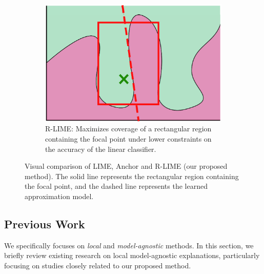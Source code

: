\documentclass[11pt]{article}
\begin{document}
\begin{figure}[tbp]
	\hspace{0.03\textwidth}
	\begin{subfigure}[t]{0.3\textwidth}
		\centering
		\includegraphics[width=\textwidth]{visual-rlime}
		\caption{%
			R-LIME:
			Maximizes coverage of a rectangular region containing the focal point
			under lower constraints on the accuracy of the linear classifier.
		}\label{fig:rlime}
	\end{subfigure}
	\caption[Visual comparison of LIME, Anchor and R-LIME]{%
		Visual comparison of LIME, Anchor and R-LIME (our proposed method).
		The solid line represents the rectangular region containing the focal
		point, and the dashed line represents the learned approximation model.
	}
\end{figure}
\subsection{Previous Work}
We specifically focuses on \emph{local} and \emph{model-agnostic} methods.
In this section,
we briefly review existing research on local model-agnostic explanations,
particularly focusing on studies closely related to our proposed method.
\end{document}

